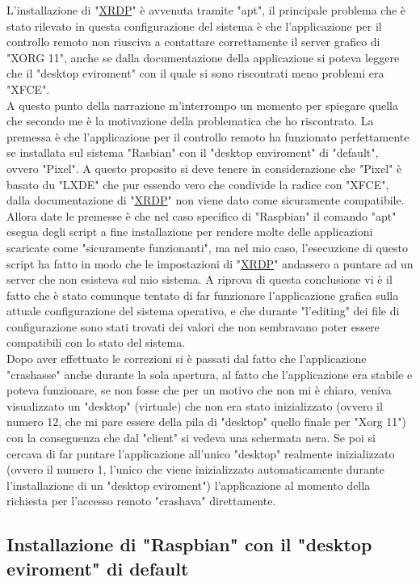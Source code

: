 L'installazione di "\href{https://github.com/neutrinolabs/xrdp}{XRDP}" è avvenuta tramite "apt", il principale problema che è stato rilevato in questa configurazione del sistema è che l'applicazione per il controllo remoto non riusciva a contattare correttamente il server grafico di "XORG 11", anche se dalla documentazione della applicazione si poteva leggere che il "desktop eviroment" con il quale si sono riscontrati meno problemi era "XFCE".\\
A questo punto della narrazione m'interrompo un momento per spiegare quella che secondo me è la motivazione della problematica che ho riscontrato. La premessa è che l'applicazione per il controllo remoto ha funzionato perfettamente se installata sul sistema "Rasbian" con il "desktop enviroment" di "default", ovvero "Pixel". A questo proposito si deve tenere in considerazione che "Pixel" è basato du "LXDE" che pur essendo vero che condivide la radice con "XFCE", dalla documentazione di "\href{https://github.com/neutrinolabs/xrdp}{XRDP}" non viene dato come sicuramente compatibile. Allora date le premesse è che nel caso specifico di "Raspbian" il comando "apt" esegua degli script a fine installazione per rendere molte delle applicazioni scaricate come "sicuramente funzionanti", ma nel mio caso, l'esecuzione di questo script ha fatto in modo che le impostazioni di "\href{https://github.com/neutrinolabs/xrdp}{XRDP}" andassero a puntare ad un server che non esisteva sul mio sistema. A riprova di questa conclusione vi è il fatto che è stato comunque tentato di far funzionare l'applicazione grafica sulla attuale configurazione del sistema operativo, e che durante "l'editing" dei file di configurazione sono stati trovati dei valori che non sembravano poter essere compatibili con lo stato del sistema.\\
Dopo aver effettuato le correzioni si è passati dal fatto che l'applicazione "crashasse" anche durante la sola apertura, al fatto che l'applicazione era stabile e poteva funzionare, se non fosse che per un motivo che non mi è chiaro, veniva visualizzato un "desktop" (virtuale) che non era stato inizializzato (ovvero il numero 12, che mi pare essere della pila di "desktop" quello finale per "Xorg 11") con la conseguenza che dal "client" si vedeva una schermata nera. Se poi si cercava di far puntare l'applicazione all'unico "desktop" realmente inizializzato  (ovvero il numero 1, l'unico che viene inizializzato automaticamente durante l'installazione di un "desktop eviroment") l'applicazione al momento della richiesta per l'accesso remoto "crashava" direttamente.\\

\subsection{Installazione di "Raspbian" con il "desktop eviroment" di default}